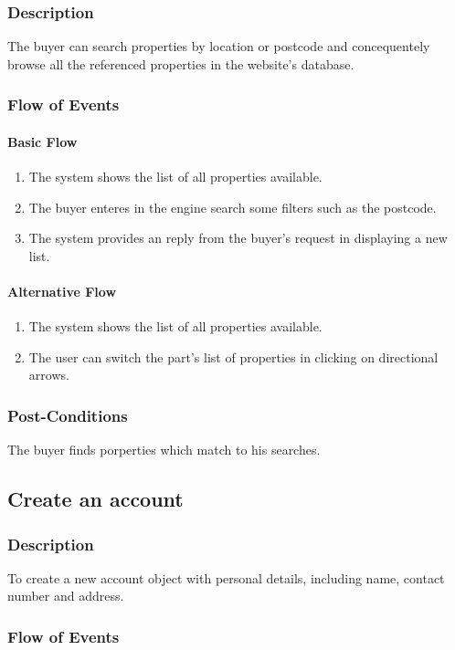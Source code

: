 \documentclass[a4paper,12pt]{article}
\begin{document}
\subsubsection{Description}
The buyer can search properties by location or postcode and concequentely browse all the referenced properties in the website's database.
\subsubsection{Flow of Events}
\paragraph{Basic Flow}
\begin{enumerate}
\item The system shows the list of all properties available.
\item The buyer enteres in the engine search some filters such as the postcode.
\item The system provides an reply from the buyer's request in displaying a new list.
\end{enumerate}
\paragraph{Alternative Flow}
\begin{enumerate}
\item The system shows the list of all properties available.
\item The user can switch the part's list of properties in clicking on directional arrows.
\end{enumerate}
\subsubsection{Post-Conditions}
The buyer finds porperties which match to his searches.

\subsection{Create an account}
\subsubsection{Description}
To create a new account object with personal details, including name, contact number and address.
\subsubsection{Flow of Events}
\end{document}
